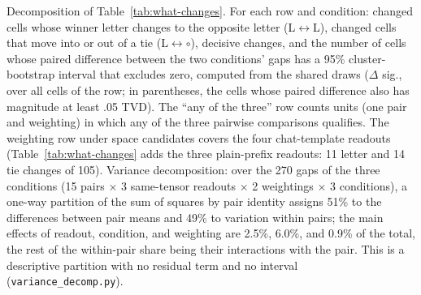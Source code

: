 \begin{table}[t]
\caption{Decomposition of Table~\ref{tab:what-changes}. For each row and condition: changed cells whose winner letter changes to the opposite letter (L$\leftrightarrow$L), changed cells that move into or out of a tie (L$\leftrightarrow$$\circ$), decisive changes, and the number of cells whose paired difference between the two conditions' gaps has a 95\% cluster-bootstrap interval that excludes zero, computed from the shared draws ($\Delta$ sig., over all cells of the row; in parentheses, the cells whose paired difference also has magnitude at least .05 TVD). The ``any of the three'' row counts units (one pair and weighting) in which any of the three pairwise comparisons qualifies. The weighting row under space candidates covers the four chat-template readouts (Table~\ref{tab:what-changes} adds the three plain-prefix readouts: 11 letter and 14 tie changes of 105). Variance decomposition: over the 270 gaps of the three conditions (15 pairs $\times$ 3 same-tensor readouts $\times$ 2 weightings $\times$ 3 conditions), a one-way partition of the sum of squares by pair identity assigns 51\% to the differences between pair means and 49\% to variation within pairs; the main effects of readout, condition, and weighting are 2.5\%, 6.0\%, and 0.9\% of the total, the rest of the within-pair share being their interactions with the pair. This is a descriptive partition with no residual term and no interval (\texttt{variance\_decomp.py}).}
\label{tab:what-changes-decomp}
\end{table}
